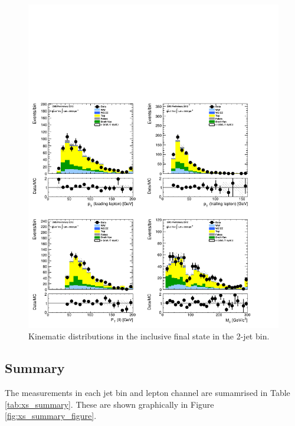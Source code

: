 \begin{figure}[!hbtp]
\centering
\includegraphics[width=1\textwidth]{figures/ww_analysis20_0_ALL_incl_2j.pdf}
\caption{Kinematic distributions in the inclusive final state in the 2-jet bin.}
\label{fig:xs_kinematics_incl_2j}
\end{figure}

\clearpage
\subsection{Summary}

The measurements in each jet bin and lepton channel are sumamrised in
Table \ref{tab:xs_summary}.  These are shown graphically 
in Figure \ref{fig:xs_summary_figure}.

